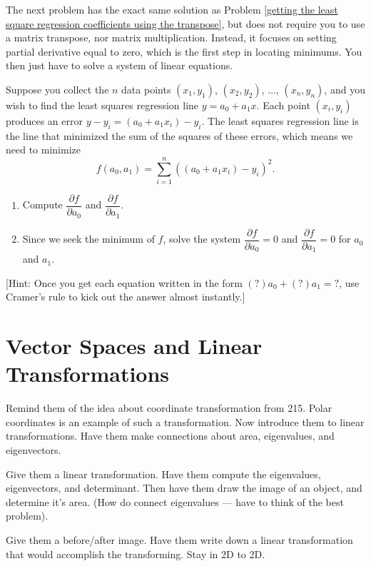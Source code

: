 The next problem has the exact same solution as Problem \ref{getting the least square regression coefficients using the transpose}, but does not require you to use a matrix transpose, nor matrix multiplication. Instead, it focuses on setting partial derivative equal to zero, which is the first step in locating minimums. You then just have to solve a system of linear equations. 
\begin{problem}
 Suppose you collect the $n$ data points $(x_1,y_1)$, $(x_2,y_2)$, $\ldots$, $(x_n,y_n)$, and you wish to find the least squares regression line $y=a_0+a_1x$. 
 Each point $(x_i,y_i)$ produces an error $y-y_i = (a_0+a_1x_i)-y_i$. The least squares regression line is the line that minimized the sum of the squares of these errors, which means we need to minimize $$f(a_0,a_1) = \sum_{i=1}^n \left((a_0+a_1x_i)-y_i\right)^2.$$
\begin{enumerate}
 \item Compute $\dfrac{\partial f}{\partial a_0}$ and $\dfrac{\partial f}{\partial a_1}$. 
 \item Since we seek the minimum of $f$, solve the system  $\dfrac{\partial f}{\partial a_0}=0$ and $\dfrac{\partial f}{\partial a_1}=0$ for $a_0$ and $a_1$.  
\end{enumerate}
[Hint: Once you get each equation written in the form $(?)a_0 +(?)a_1 = ?$, use Cramer's rule to kick out the answer almost instantly.]
\end{problem}




\section{Vector Spaces and Linear Transformations}
Remind them of the idea about coordinate transformation from 215.  Polar coordinates is an example of such a transformation.  Now introduce them to linear transformations. Have them make connections about area, eigenvalues, and eigenvectors.

\begin{problem}
 Give them a linear transformation.  Have them compute the eigenvalues, eigenvectors, and determinant.  Then have them draw the image of an object, and determine it's area.  (How do connect eigenvalues --- have to think of the best problem).
\end{problem}

\begin{problem}
 Give them a before/after image.  Have them write down a linear transformation that would accomplish the transforming.  Stay in 2D to 2D.
\end{problem}

